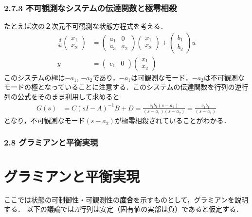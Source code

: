\begin{frame}[t]
\frametitle{2.7.3 不可観測なシステムの伝達関数と極零相殺}
たとえば次の２次元不可観測な状態方程式を考える．
\begin{align}
 \frac{d}{dt}
  \left(\begin{array}{c}
         {x}_1 \\
	 {x}_2 
	\end{array}\right)
  &=
  \left(\begin{array}{cc}
         a_1 & 0 \\
	     a_3 & a_2
	\end{array}\right)
  \left(\begin{array}{c}
         {x}_1 \\
	 {x}_2 
	\end{array}\right)
  +
  \left(\begin{array}{c}
         b_1 \\
	 b_2
	\end{array}\right)
  u \\
 y &=
  \left(\begin{array}{cc}
         c_1 & 0 
	\end{array}\right)
  \left(\begin{array}{c}
         {x}_1 \\
	 {x}_2 
	\end{array}\right)
\end{align}
このシステムの極は$-a_1$, $-a_2$であり，$-a_1$は可観測なモード，$-a_2$は不可観測なモードの極となっていることに注意する．このシステムの伝達関数を行列の逆行列の公式をそのまま利用して求めると
\begin{align}
	G(s) & = C(sI-A)^{-1}B + D
	= 
		\frac{c_1 b_1(s-a_2)}{(s-a_1)(s-a_2)}
	= 
		\frac{c_1 b_1}{(s-a_1)}
\end{align}
となり，不可観測なモード$(s-a_2)$が極零相殺されていることがわかる．



\end{frame}

\begin{frame}[t]
\frametitle{2.8 グラミアンと平衡実現}

\section{グラミアンと平衡実現}

ここでは状態の可制御性・可観測性の{\bf 度合}を示すものとして，グラミアンを説明する．
以下の議論では$A$行列は安定（固有値の実部は負）であると仮定する．

\end{frame}

